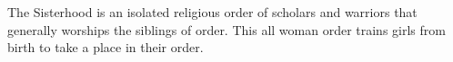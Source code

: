 The Sisterhood is an isolated religious order of scholars and warriors that generally worships the siblings of order.
This all woman order trains girls from birth to take a place in their order.

